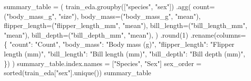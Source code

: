 \documentclass[
  letterpaper,
  DIV=11,
  numbers=noendperiod]{scrartcl}
\newenvironment{Shaded}{\begin{snugshade}}{\end{snugshade}}
\newcommand{\BuiltInTok}[1]{\textcolor[rgb]{0.00,0.23,0.31}{#1}}
\newcommand{\DecValTok}[1]{\textcolor[rgb]{0.68,0.00,0.00}{#1}}
\newcommand{\NormalTok}[1]{\textcolor[rgb]{0.00,0.23,0.31}{#1}}
\newcommand{\OperatorTok}[1]{\textcolor[rgb]{0.37,0.37,0.37}{#1}}
\newcommand{\StringTok}[1]{\textcolor[rgb]{0.13,0.47,0.30}{#1}}
\begin{document}
\begin{Shaded}
\begin{Highlighting}[]
\NormalTok{summary\_table }\OperatorTok{=}\NormalTok{ (}
\NormalTok{    train\_eda.groupby([}\StringTok{"species"}\NormalTok{, }\StringTok{"sex"}\NormalTok{])}
\NormalTok{    .agg(}
\NormalTok{        count}\OperatorTok{=}\NormalTok{(}\StringTok{"body\_mass\_g"}\NormalTok{, }\StringTok{"size"}\NormalTok{),}
\NormalTok{        body\_mass}\OperatorTok{=}\NormalTok{(}\StringTok{"body\_mass\_g"}\NormalTok{, }\StringTok{"mean"}\NormalTok{),}
\NormalTok{        flipper\_length}\OperatorTok{=}\NormalTok{(}\StringTok{"flipper\_length\_mm"}\NormalTok{, }\StringTok{"mean"}\NormalTok{),}
\NormalTok{        bill\_length}\OperatorTok{=}\NormalTok{(}\StringTok{"bill\_length\_mm"}\NormalTok{, }\StringTok{"mean"}\NormalTok{),}
\NormalTok{        bill\_depth}\OperatorTok{=}\NormalTok{(}\StringTok{"bill\_depth\_mm"}\NormalTok{, }\StringTok{"mean"}\NormalTok{),}
\NormalTok{    )}
\NormalTok{    .}\BuiltInTok{round}\NormalTok{(}\DecValTok{1}\NormalTok{)}
\NormalTok{    .rename(columns}\OperatorTok{=}\NormalTok{\{}
        \StringTok{"count"}\NormalTok{: }\StringTok{"Count"}\NormalTok{,}
        \StringTok{"body\_mass"}\NormalTok{: }\StringTok{"Body mass (g)"}\NormalTok{,}
        \StringTok{"flipper\_length"}\NormalTok{: }\StringTok{"Flipper length (mm)"}\NormalTok{,}
        \StringTok{"bill\_length"}\NormalTok{: }\StringTok{"Bill length (mm)"}\NormalTok{,}
        \StringTok{"bill\_depth"}\NormalTok{: }\StringTok{"Bill depth (mm)"}\NormalTok{,}
\NormalTok{    \})}
\NormalTok{)}
\NormalTok{summary\_table.index.names }\OperatorTok{=}\NormalTok{ [}\StringTok{"Species"}\NormalTok{, }\StringTok{"Sex"}\NormalTok{]}
\NormalTok{sex\_order }\OperatorTok{=} \BuiltInTok{sorted}\NormalTok{(train\_eda[}\StringTok{"sex"}\NormalTok{].unique())}
\NormalTok{summary\_table}
\end{Highlighting}
\end{Shaded}
\end{document}
